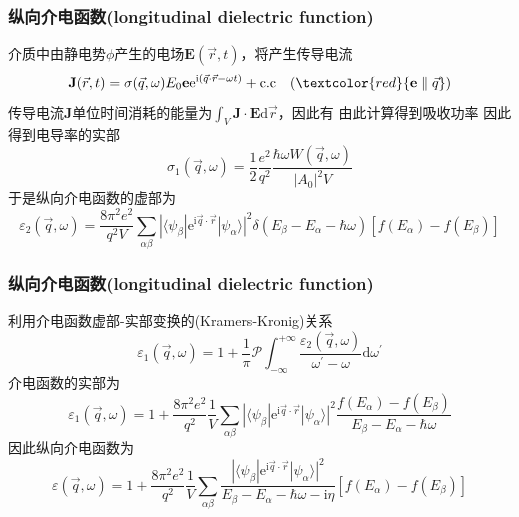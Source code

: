 {\frame
{
	\frametitle{纵向介电函数\textrm{(longitudinal dielectric function)}}
	介质中由静电势$\phi$产生的电场$\mathbf{E}(\vec r,t)$，将产生传导电流
	\begin{displaymath}
		\mathbf{J}(\vec r,t)=\sigma(\vec q,\omega)E_0\mathbf{e}\mathrm{e}^{\mathrm{i}(\vec q\cdot\vec r-\omega t)}+\mathrm{c.c}\quad(\textcolor{red}{\mathbf{e}\parallel\vec q})
	\end{displaymath}
	传导电流$\mathbf{J}$单位时间消耗的能量为$\int_V\mathbf{J}\cdot\mathbf{E}\mathrm{d}\vec r$，因此有
由此计算得到吸收功率
{\fontsize{8.2pt}{6.2pt}}
因此得到电导率的实部
\begin{displaymath}
	\sigma_1(\vec q,\omega)=\frac12\frac{e^2}{q^2}\frac{\hbar\omega W(\vec q,\omega)}{|A_0|^2V}
\end{displaymath}
于是纵向介电函数的虚部为
\begin{displaymath}
	\varepsilon_2(\vec q,\omega)=\frac{8\pi^2e^2}{q^2V}\sum_{\alpha\beta}|\langle\psi_{\beta}|\mathrm{e}^{\mathrm{i}\vec q\cdot\vec r}|\psi_{\alpha}\rangle|^2\delta(E_{\beta}-E_{\alpha}-\hbar\omega)[f(E_{\alpha})-f(E_{\beta})]
\end{displaymath}
}

\frame
{
	\frametitle{纵向介电函数\textrm{(longitudinal dielectric function)}}
	利用介电函数虚部-实部变换的\textrm{(Kramers-Kronig)}关系
	\begin{displaymath}
		\varepsilon_1(\vec q,\omega)=1+\frac1{\pi}\mathscr{P}\int_{-\infty}^{+\infty}\frac{\varepsilon_2(\vec q,\omega)}{\omega^{\prime}-\omega}\mathrm{d}\omega^{\prime}
	\end{displaymath}
介电函数的实部为
\begin{displaymath}
	\varepsilon_1(\vec q,\omega)=1+\frac{8\pi^2e^2}{q^2}\frac1V\sum_{\alpha\beta}|\langle\psi_{\beta}|\mathrm{e}^{\mathrm{i}\vec q\cdot\vec r}|\psi_{\alpha}\rangle|^2\frac{f(E_{\alpha})-f(E_{\beta})}{E_{\beta}-E_{\alpha}-\hbar\omega}
\end{displaymath}
因此纵向介电函数为
	\begin{displaymath}
		\varepsilon(\vec q,\omega)=1+\frac{8\pi^2e^2}{q^2}\frac1V\sum_{\alpha\beta}\frac{|\langle\psi_{\beta}|\mathrm{e}^{\mathrm{i}\vec q\cdot\vec r}|\psi_{\alpha}\rangle|^2}{E_{\beta}-E_{\alpha}-\hbar\omega-\mathrm{i}\eta}[f(E_{\alpha})-f(E_{\beta})]
	\end{displaymath}
}

}
